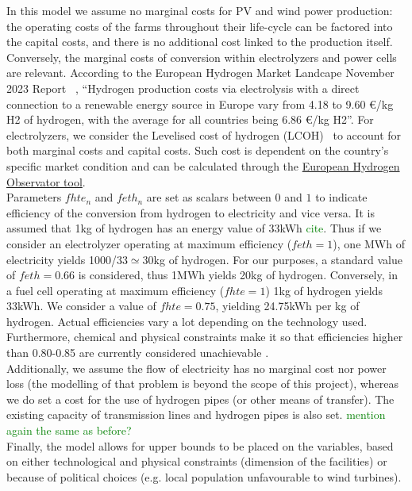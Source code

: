 \indent In this model we assume no marginal costs for PV and wind power production: the operating costs of the farms throughout their life-cycle can be factored into the capital costs, and there is no additional cost linked to the production itself. \\
\indent Conversely, the marginal costs of conversion within electrolyzers and power cells are relevant. According to the European Hydrogen Market Landcape November 2023 Report  \textcolor{green}{\cite{European_H2_Market_landscape}}, ``Hydrogen production costs via electrolysis with a direct connection to a renewable energy source in Europe vary from 4.18 to 9.60 €/kg H2 of hydrogen, with the average for all countries being 6.86 €/kg H2''. For electrolyzers, we consider the Levelised cost of hydrogen (LCOH)  to account for both marginal costs and capital costs. Such cost is dependent on the country's specific market condition and can be calculated through the \textcolor{green}{\href{https://observatory.clean-hydrogen.europa.eu/tools-reports/levelised-cost-hydrogen-calculator}{European Hydrogen Observator tool}}.\\
\indent Parameters $fhte_n$ and $feth_n$ are set as scalars between $0$ and $1$ to indicate efficiency of the conversion from hydrogen to electricity and vice versa. It is assumed that 1kg of hydrogen has an energy value of 33kWh \textcolor{green}{cite}. Thus if we consider an electrolyzer operating at maximum efficiency ($feth=1$), one MWh of electricity yields 1000/33$\simeq$30kg of hydrogen. For our purposes, a standard value of $feth=0.66$ is considered, thus 1MWh yields 20kg of hydrogen. Conversely, in a fuel cell operating at maximum efficiency ($fhte=1$) 1kg of hydrogen yields 33kWh. We consider a value of $fhte=0.75$, yielding 24.75kWh per kg of hydrogen. Actual efficiencies vary a lot depending on the technology used. Furthermore, chemical and physical constraints make it so that efficiencies higher than 0.80-0.85 are currently considered unachievable \cite{DAWOOD}.\\
\indent Additionally, we assume the flow of electricity has no marginal cost nor power loss (the modelling of that problem is beyond the scope of this project), whereas we do set a cost for the use of hydrogen pipes (or other means of transfer). The existing capacity of transmission lines and hydrogen pipes is also set. \textcolor{green}{mention again the same as before?}\\
\indent Finally, the model allows for upper bounds to be placed on the variables, based on either technological and physical constraints (dimension of the facilities) or because of political choices (e.g. local population unfavourable to wind turbines).\\

